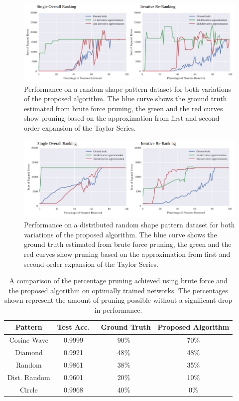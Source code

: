 \begin{figure}
  \includegraphics[width=\linewidth]{rshape.png}
  \caption{Performance on a random shape pattern dataset for both variations of the proposed algorithm. The blue curve shows the ground truth estimated from brute force pruning, the green and the red curves show pruning based on the approximation from first and second-order expansion of the Taylor Series.}
  \label{fig:rshape}
\end{figure}

\begin{figure}
  \includegraphics[width=\linewidth]{drshape.png}
  \caption{Performance on a distributed random shape pattern dataset for both variations of the proposed algorithm. The blue curve shows the ground truth estimated from brute force pruning, the green and the red curves show pruning based on the approximation from first and second-order expansion of the Taylor Series.}
  \label{fig:drshape}
\end{figure}

\begin{table}[h!]
  \begin{center}
    \begin{tabular}{c||c||c||c}
    	Pattern & Test Acc. & \ Ground Truth & Proposed Algorithm\\
    	\hline
    	\hline
      	Cosine Wave & 0.9999 & 90$\%$ & 70$\%$\\
      	\hline
      	Diamond & 0.9921 & 48$\%$ & 48$\%$\\
      	\hline 
      	Random & 0.9861 & 38$\%$ & 35$\%$\\
      	\hline 
      	Dist. Random & 0.9601 & 20$\%$ & 10$\%$\\
      	\hline
      	Circle & 0.9968 & 40$\%$ & 0$\%$\\
    \end{tabular}
  \end{center}
  \caption{A comparison of the percentage pruning achieved using brute force and the proposed algorithm on optimally trained networks. The percentages shown represent the amount of pruning possible without a significant drop in performance.}
  \label{tab:results}
\end{table}
